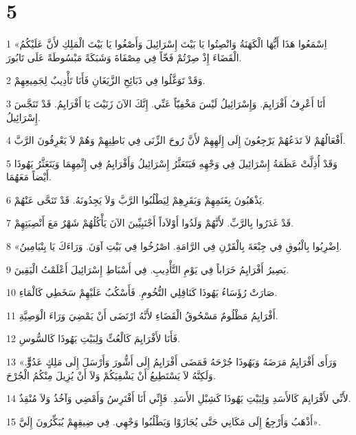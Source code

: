 \chapter{5}

\par 1 «اِسْمَعُوا هَذَا أَيُّهَا الْكَهَنَةُ وَانْصِتُوا يَا بَيْتَ إِسْرَائِيلَ وَأَصْغُوا يَا بَيْتَ الْمَلِكِ لأَنَّ عَلَيْكُمُ الْقَضَاءَ إِذْ صِرْتُمْ فَخّاً فِي مِصْفَاةَ وَشَبَكَةً مَبْسُوطَةً عَلَى تَابُورَ.
\par 2 وَقَدْ تَوَغَّلُوا فِي ذَبَائِحِ الزَّيَغَانِ فَأَنَا تَأْدِيبٌ لِجَمِيعِهِمْ.
\par 3 أَنَا أَعْرِفُ أَفْرَايِمَ. وَإِسْرَائِيلُ لَيْسَ مَخْفِيّاً عَنِّي. إِنَّكَ الآنَ زَنَيْتَ يَا أَفْرَايِمُ. قَدْ تَنَجَّسَ إِسْرَائِيلُ.
\par 4 أَفْعَالُهُمْ لاَ تَدَعُهُمْ يَرْجِعُونَ إِلَى إِلَهِهِمْ لأَنَّ رُوحَ الزِّنَى فِي بَاطِنِهِمْ وَهُمْ لاَ يَعْرِفُونَ الرَّبَّ.
\par 5 وَقَدْ أُذِلَّتْ عَظَمَةُ إِسْرَائِيلَ فِي وَجْهِهِ فَيَتَعَثَّرُ إِسْرَائِيلُ وَأَفْرَايِمُ فِي إِثْمِهِمَا وَيَتَعَثَّرُ يَهُوذَا أَيْضاً مَعَهُمَا.
\par 6 يَذْهَبُونَ بِغَنَمِهِمْ وَبَقَرِهِمْ لِيَطْلُبُوا الرَّبَّ وَلاَ يَجِدُونَهُ. قَدْ تَنَحَّى عَنْهُمْ.
\par 7 قَدْ غَدَرُوا بِالرَّبِّ. لأَنَّهُمْ وَلَدُوا أَوْلاَداً أَجْنَبِيِّينَ الآنَ يَأْكُلُهُمْ شَهْرٌ مَعَ أَنْصِبَتِهِمْ.
\par 8 «اِضْرِبُوا بِالْبُوقِ فِي جِبْعَةَ بِالْقَرْنِ فِي الرَّامَةِ. اصْرُخُوا فِي بَيْتِ آوَنَ. وَرَاءَكَ يَا بِنْيَامِينُ.
\par 9 يَصِيرُ أَفْرَايِمُ خَرَاباً فِي يَوْمِ التَّأْدِيبِ. فِي أَسْبَاطِ إِسْرَائِيلَ أَعْلَمْتُ الْيَقِينَ.
\par 10 صَارَتْ رُؤَسَاءُ يَهُوذَا كَنَاقِلِي التُّخُومِ. فَأَسْكُبُ عَلَيْهِمْ سَخَطِي كَالْمَاءِ.
\par 11 أَفْرَايِمُ مَظْلُومٌ مَسْحُوقُ الْقَضَاءِ لأَنَّهُ ارْتَضَى أَنْ يَمْضِيَ وَرَاءَ الْوَصِيَّةِ.
\par 12 فَأَنَا لأَفْرَايِمَ كَالْعُثِّ وَلِبَيْتِ يَهُوذَا كَالسُّوسِ.
\par 13 «وَرَأَى أَفْرَايِمُ مَرَضَهُ وَيَهُوذَا جُرْحَهُ فَمَضَى أَفْرَايِمُ إِلَى أَشُّورَ وَأَرْسَلَ إِلَى مَلِكٍ عَدُوٍّّ. وَلَكِنَّهُ لاَ يَسْتَطِيعُ أَنْ يَشْفِيَكُمْ وَلاَ أَنْ يُزِيلَ مِنْكُمُ الْجُرْحَ.
\par 14 لأَنِّي لأَفْرَايِمَ كَالأَسَدِ وَلِبَيْتِ يَهُوذَا كَشِبْلِ الأَسَدِ. فَإِنِّي أَنَا أَفْتَرِسُ وَأَمْضِي وَآخُذُ وَلاَ مُنْقِذٌ.
\par 15 أَذْهَبُ وَأَرْجِعُ إِلَى مَكَانِي حَتَّى يُجَازَوْا وَيَطْلُبُوا وَجْهِي. فِي ضِيقِهِمْ يُبَكِّرُونَ إِلَيَّ».

